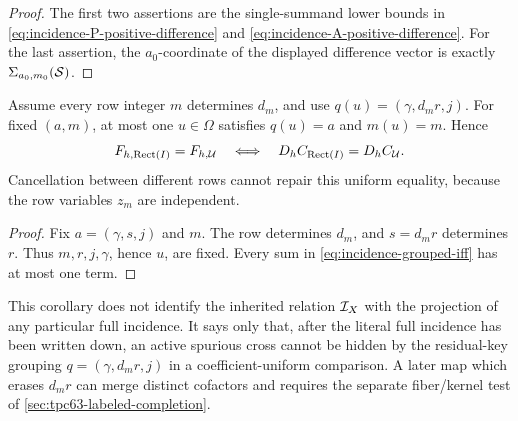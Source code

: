 \begin{proof}
The first two assertions are the single-summand lower bounds in
\eqref{eq:incidence-P-positive-difference} and
\eqref{eq:incidence-A-positive-difference}.  For the last assertion, the
\(a_0\)-coordinate of the displayed difference vector is exactly
\(\Sigma_{a_0,m_0}(\mathcal S)\).
\end{proof}

\begin{corollary}
\label{cor:incidence-physical-key-singleton}
Assume every row integer \(m\) determines \(d_m\), and use
\(q(u)=(\gamma,d_mr,j)\).  For fixed \((a,m)\), at most one
\(u\in\Omega\) satisfies \(q(u)=a\) and \(m(u)=m\).  Hence
\begin{equation}
 F_{h,\operatorname{Rect}(I)}=F_{h,\mathcal U}
 \quad\Longleftrightarrow\quad
 D_hC_{\operatorname{Rect}(I)}=D_hC_{\mathcal U}.
 \label{eq:incidence-physical-grouped-atomic-equivalence}
\end{equation}
Cancellation between different rows cannot repair this uniform equality,
because the row variables \(z_m\) are independent.
\end{corollary}

\begin{proof}
Fix \(a=(\gamma,s,j)\) and \(m\).  The row determines \(d_m\), and
\(s=d_mr\) determines \(r\).  Thus \(m,r,j,\gamma\), hence \(u\), are
fixed.  Every sum in \eqref{eq:incidence-grouped-iff} has at most one term.
\end{proof}

This corollary does not identify the inherited relation \(\mathcal I_X\) with the
projection of any particular full incidence.  It says only that, after the
literal full incidence has been written down, an active spurious cross
cannot be hidden by the residual-key grouping
\(q=(\gamma,d_mr,j)\) in a coefficient-uniform comparison.  A later map
which erases \(d_mr\) can merge distinct cofactors and requires the separate
fiber/kernel test of \cref{sec:tpc63-labeled-completion}.
